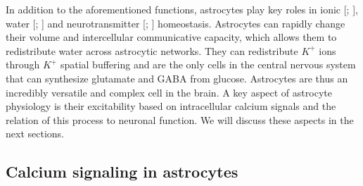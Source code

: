 In addition to the aforementioned functions, astrocytes play key roles in ionic [\cite{sibille2014}; \cite{nwaobi2016}], water [\cite{nielsen1997}; \cite{risher2009}] and neurotransmitter [\cite{danbolt2001glutamate}; \cite{herman2007}] homeostasis. 
Astrocytes can rapidly change their volume and intercellular communicative capacity, which allows them to redistribute water across astrocytic networks.  
They can redistribute $K^+$ ions through $K^+$ spatial buffering and are the only cells in the central nervous system that can synthesize glutamate and GABA from glucose. 
Astrocytes are thus an incredibly versatile and complex cell in the brain. A key aspect of astrocyte physiology is their excitability based on intracellular calcium signals and the relation of this process to neuronal function. 
We will discuss these aspects in the next sections. 

\subsection{Calcium signaling in astrocytes}
\label{chap1:sec:2:subsec2:astro_calcium_signals}

